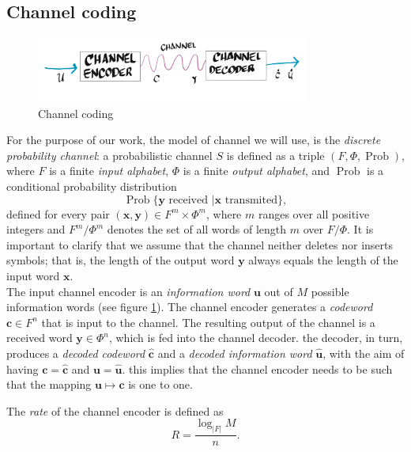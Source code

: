 \subsection{Channel coding}
\begin{figure}[H]
\centering
\includegraphics[width=0.8\textwidth]{Figures/Channel_decoder.png}
\caption{Channel coding}
\label{CH2:Channel_communication_2}
\end{figure}
For the purpose of our work, the model of channel we will use, is the \textit{discrete probability channel}: a probabilistic channel $S$ is defined as a triple $(F,\Phi,\operatorname{Prob})$, where $F$ is a finite \textit{input alphabet}, $\Phi$ is a finite \textit{output alphabet}, and $\operatorname{Prob}$ is a conditional probability distribution
\begin{equation}
\operatorname{Prob}\{\mathbf{y}\text{ received }|\mathbf{x}\text{ transmited}\},
\end{equation}
defined for every pair $(\mathbf{x},\mathbf{y})\in F^{m}\times\Phi^m$, where $m$ ranges over all positive integers and $F^m/\Phi^m$ denotes the set of all words of length $m$ over $F/\Phi$. It is important to clarify that we assume that the channel neither deletes nor inserts symbols; that is, the length of the output word $\mathbf{y}$ always equals the length of the input word $\mathbf{x}$.\\
\indent The input channel encoder is an \textit{information word} $\mathbf{u}$ out of $M$ possible information words (see figure \ref{CH2:Channel_communication_2}). The channel encoder generates a \textit{codeword} $\mathbf{c}\in F^n$ that is input to the channel. The resulting output of the channel is a received word $\mathbf{y}\in\Phi^n$, which is fed into the channel decoder. the decoder, in turn, produces a \textit{decoded codeword} $\hat{\mathbf{c}}$ and a \textit{decoded information word} $\hat{\mathbf{u}}$, with the aim of having $\mathbf{c}=\hat{\mathbf{c}}$ and $\mathbf{u}=\hat{\mathbf{u}}$. this implies that the channel encoder needs to be such that the mapping $\mathbf{u}\mapsto \mathbf{c}$ is one to one.
\begin{definition}
The \textit{rate} of the channel encoder is defined as 
\begin{equation}
R = \frac{\log_{|F|}M}{n}.
\end{equation}
\end{definition}
